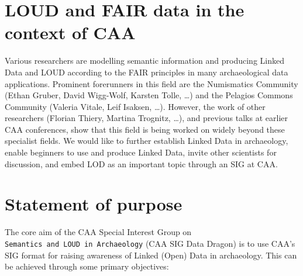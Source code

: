 \documentclass[a4paper]{article}
\begin{document}
\section{LOUD and FAIR data in the context of CAA}\label{loud-and-fair-data-in-the-context-of-caa}

Various researchers are modelling semantic information and producing Linked Data and LOUD according to the FAIR principles in many archaeological data applications. Prominent forerunners in this field are the Numismatics Community (Ethan Gruber, David Wigg-Wolf, Karsten Tolle, \ldots{}) and the Pelagios Commons Community (Valeria Vitale, Leif Isaksen, \ldots{}). However, the work of other researchers (Florian Thiery, Martina Trognitz, \ldots{}), and previous talks at earlier CAA conferences, show that this field is being worked on widely beyond these specialist fields. We would like to further establish Linked Data in archaeology, enable beginners to use and produce Linked Data, invite other scientists for discussion, and embed LOD as an important topic through an SIG at CAA.

\section{Statement of purpose}\label{statement-of-purpose}

The core aim of the CAA Special Interest Group on \texttt{Semantics\ and\ LOUD\ in\ Archaeology} (CAA SIG Data Dragon) is to use CAA's SIG format for raising awareness of Linked (Open) Data in archaeology. This can be achieved through some primary objectives:
\end{document}
